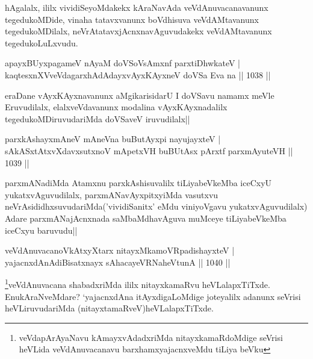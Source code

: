 \begin{artha}
hAgalalx, ililx vividiSeyoMdakekx kAraNavAda veVdAnuvacanavanunx tegedukoMDide, vinaha 
tatavxvanunx boVdhisuva veVdAMtavanunx tegedukoMDilalx, neVrAtatavxjAcnxnavAguvudakekx 
veVdAMtavanunx tegedukoLuLxvudu.
\end{artha}

\begin{shl}
apayxBUyxpagameV nAyaM doVSoV\s sAmxnf parxtiDhwkateV |\\
kaqtesxnXVveVdagarxhAdAdayxvAyxKAyxneV doVSa Eva na || 1038 ||
\end{shl}

\begin{artha}
eraDane vAyxKAyxnavanunx aMgikarisidarU I doVSavu namamx meVle Eruvudilalx, 
elalxveVdavanunx modalina vAyxKAyxnadalilx tegedukoMDiruvudariMda doVSaveV iruvudilalx||
\end{artha}


\begin{shl}
parxkAshayxmAneV mAneVna buButAyx\s pi nayujayxteV |\\
sAkASxtAtxvXdavxsutxnoV mApetxVH buBUtAsx pArxtf parxmAyuteVH || 1039 ||
\end{shl}

\begin{artha}
parxmANadiMda Atamxnu parxkAshisuvalilx tiLiyabeVkeMba iceCxyU yukatxvAguvudilalx, 
parxmANavAyxpitxyiMda vasutxvu neVrAsididhxsuvudariMda('vividiSanitx' eMdu viniyoVgavu 
yukatxvAguvudilalx) Adare parxmANajAcnxnada saMbaMdhavAguva muMceye tiLiyabeVkeMba iceCxyu 
baruvudu||
\end{artha}


\begin{shl}
veVdAnuvacanoVkAtxyX\s tarx nitayxMkamoVRpadishayxteV |\\
yajacnxdAnAdiBisatxnayx sAhacayeVRNaheVtunA || 1040 ||
\end{shl}

\begin{artha}
\footnote{veVdapArAyaNavu kAmayxvAdadxriMda nitayxkamaRdoMdige seVrisi heVLida 
veVdAnuvacanavu barxhamxyajacnxveMdu tiLiya beVku}veVdAnuvacana shabadxriMda ililx 
nitayxkamaRvu heVLalapxTiTxde. EnukAraNveMdare? 
`yajacnxdAna itAyxdigaLoMdige joteyalilx adanunx seVrisi heVLiruvudariMda 
(nitayxtamaRveV)heVLalapxTiTxde.
\end{artha}

